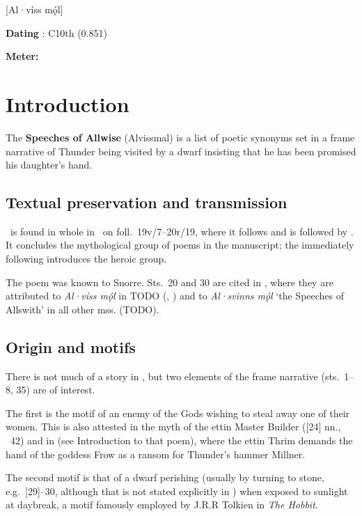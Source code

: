 [Al·víss mǫ́l]

\begin{flushright}%
\textbf{Dating} \parencite{Sapp2022}: C10th (0.851)

\textbf{Meter:} \Ljodahattr%
\end{flushright}

\section{Introduction}

The \textbf{Speeches of Allwise} (Alvissmal) is a list of poetic synonyms set in a frame narrative of Thunder being visited by a dwarf insisting that he has been promised his daughter’s hand.

\subsection{Textual preservation and transmission}

\Alvissmal\ is found in whole in \Regius\ on foll.~19v/7--20r/19, where it follows  and is followed by .  It concludes the mythological group of poems in the manuscript; the immediately following  introduces the heroic group.

The poem was known to Snorre.  Sts.~20 and 30 are cited in \Skaldskaparmal, where they are attributed to \emph{Al·víss mǫ́l} in TODO (\AMb, \EddaCms) and to \emph{Al·svinns mǫ́l} ‘the Speeches of Allswith’ in all other mss. (TODO).

\subsection{Origin and motifs}

There is not much of a story in \Alvissmal, but two elements of the frame narrative (sts.~1--8, 35) are of interest.

The first is the motif of an enemy of the Gods wishing to steal away one of their women.  This is also attested in the myth of the ettin Master Builder ([24] nn., \Gylfaginning~42) and in  (see Introduction to that poem), where the ettin Thrim demands the hand of the goddess Frow as a ransom for Thunder’s hammer Millner.

The second motif is that of a dwarf perishing (usually by turning to stone, e.g.~[29]--30, although that is not stated explicitly in \Alvissmal) when exposed to sunlight at daybreak, a motif famously employed by J.R.R Tolkien in \emph{The Hobbit}.

